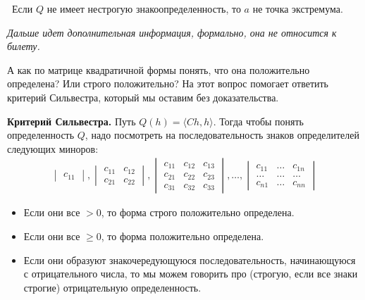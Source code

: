 \notice \, Если $Q$ не имеет нестрогую знакоопределенность, то $a$ не точка экстремума.

\vspace*{5mm}

\textit{Дальше идет дополнительная информация, формально, она не относится к билету.}

А как по матрице квадратичной формы понять, что она положительно определена? Или строго положительно?
На этот вопрос помогает ответить критерий Сильвестра, который мы оставим без доказательства.

\textbf{Критерий Сильвестра.} Путь $Q(h) = \langle Ch, h \rangle$. 
Тогда чтобы понять определенность $Q$, надо посмотреть на последовательность знаков определителей следующих миноров: \begin{gather*}
    \begin{vmatrix}
        c_{11}
    \end{vmatrix}, \begin{vmatrix}
        c_{11} & c_{12} \\
        c_{21} & c_{22}
    \end{vmatrix}, \begin{vmatrix}
        c_{11} & c_{12} & c_{13} \\
        c_{21} & c_{22} & c_{23} \\
        c_{31} & c_{32} & c_{33}    
    \end{vmatrix}, \dots, \begin{vmatrix}
        c_{11} & \dots & c_{1n} \\
        \dots & \dots & \dots \\
        c_{n1} & \dots & c_{nn} 
    \end{vmatrix}
\end{gather*} 
\begin{itemize}
    \item Если они все $> 0$, то форма строго положительно определена.
    \item Если они все $\geqslant 0$, то форма положительно определена.
    \item Если они образуют знакочередующуюся последовательность, начинающуюся с отрицательного числа, то мы можем говорить про (строгую, если все знаки строгие) отрицательную определенность.
\end{itemize}

